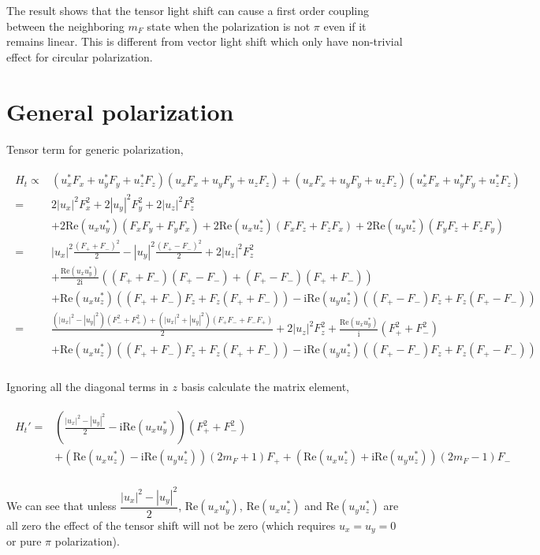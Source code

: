 \documentclass[10pt,fleqn]{article}
\newcommand{\ui}{\mathrm{i}}
\newcommand{\eqar}[1]
{
  \begin{align}
    #1
  \end{align}
}
\newcommand{\paren}[1]{{\left({#1}\right)}}
\newcommand{\abs}[1]{{\left|{#1}\right|}}
\begin{document}
The result shows that the tensor light shift can cause a first order coupling between
the neighboring $m_F$ state when the polarization is not $\pi$
even if it remains linear. This is different from vector light shift
which only have non-trivial effect for circular polarization.\\

\section{General polarization}
\label{general-pol}
Tensor term for generic polarization,
\eqar{
  \begin{split}
    H_t\propto&\paren{u_x^*F_x+u_y^*F_y+u_z^*F_z}\paren{u_xF_x+u_yF_y+u_zF_z}+\paren{u_xF_x+u_yF_y+u_zF_z}\paren{u_x^*F_x+u_y^*F_y+u_z^*F_z}\\
    =&2\abs{u_x}^2F_x^2+2\abs{u_y}^2F_y^2+2\abs{u_z}^2F_z^2\\
              &+2\mathrm{Re}\paren{u_xu_y^*}\paren{F_xF_y+F_yF_x}
                +2\mathrm{Re}\paren{u_xu_z^*}\paren{F_xF_z+F_zF_x}
                +2\mathrm{Re}\paren{u_yu_z^*}\paren{F_yF_z+F_zF_y}\\
    =&\abs{u_x}^2\frac{\paren{F_++F_-}^2}{2}-\abs{u_y}^2\frac{\paren{F_+-F_-}^2}{2}+2\abs{u_z}^2F_z^2\\
              &+\frac{\mathrm{Re}\paren{u_xu_y^*}}{2\ui}\paren{\paren{F_++F_-}\paren{F_+-F_-}+\paren{F_+-F_-}\paren{F_++F_-}}\\
              &+\mathrm{Re}\paren{u_xu_z^*}\paren{\paren{F_++F_-}F_z+F_z\paren{F_++F_-}}
                -\ui\mathrm{Re}\paren{u_yu_z^*}\paren{\paren{F_+-F_-}F_z+F_z\paren{F_+-F_-}}\\
    =&\frac{\paren{\abs{u_x}^2-\abs{u_y}^2}\paren{F_-^2+F_+^2}
       +\paren{\abs{u_x}^2+\abs{u_y}^2}\paren{F_+F_-+F_-F_+}}{2}+2\abs{u_z}^2F_z^2
       +\frac{\mathrm{Re}\paren{u_xu_y^*}}{\ui}\paren{F_+^2+F_-^2}\\
              &+\mathrm{Re}\paren{u_xu_z^*}\paren{\paren{F_++F_-}F_z+F_z\paren{F_++F_-}}
                -\ui\mathrm{Re}\paren{u_yu_z^*}\paren{\paren{F_+-F_-}F_z+F_z\paren{F_+-F_-}}\\
  \end{split}
}
Ignoring all the diagonal terms in $z$ basis calculate the matrix element,
\eqar{
  \begin{split}
    H_t'=&\paren{\frac{\abs{u_x}^2-\abs{u_y}^2}{2}
           -\ui\mathrm{Re}\paren{u_xu_y^*}}\paren{F_+^2+F_-^2}\\
         &+\paren{\mathrm{Re}\paren{u_xu_z^*}-\ui\mathrm{Re}\paren{u_yu_z^*}}\paren{2m_F+1}F_+
           +\paren{\mathrm{Re}\paren{u_xu_z^*}+\ui\mathrm{Re}\paren{u_yu_z^*}}\paren{2m_F-1}F_-\\
  \end{split}
}
We can see that unless $\dfrac{\abs{u_x}^2-\abs{u_y}^2}{2}$,
$\mathrm{Re}\paren{u_xu_y^*}$, $\mathrm{Re}\paren{u_xu_z^*}$ and
$\mathrm{Re}\paren{u_yu_z^*}$ are all zero the effect of
the tensor shift will not be zero (which requires $u_x=u_y=0$
or pure $\pi$ polarization).\\
\end{document}
